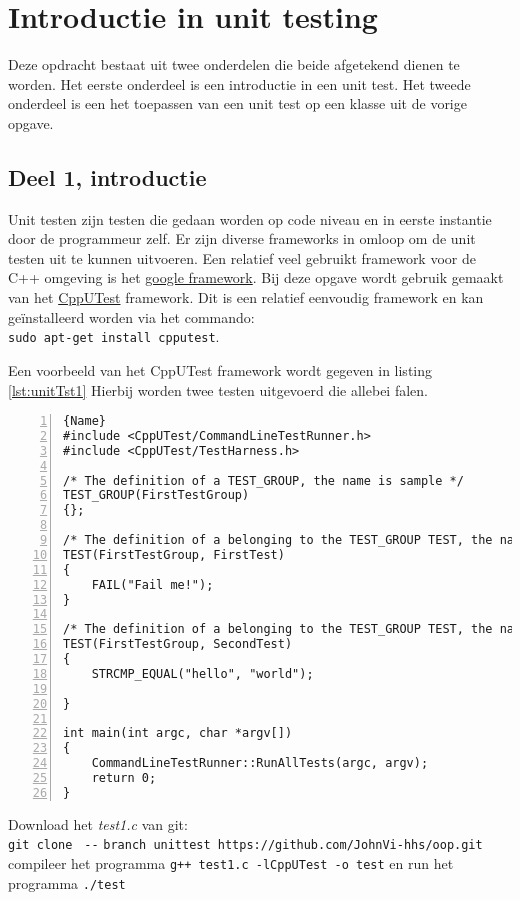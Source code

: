 \chapter{Introductie in unit testing} \label{chap:unittst}

Deze opdracht bestaat uit twee onderdelen die beide afgetekend dienen te worden.
Het eerste onderdeel is een introductie in een unit test. Het tweede onderdeel is een het toepassen van een unit test op een klasse uit de vorige opgave.

\section{Deel 1, introductie}

Unit testen zijn testen die gedaan worden op code niveau en in eerste instantie door de programmeur zelf. 
Er zijn diverse frameworks in omloop om de unit testen uit te kunnen uitvoeren.
Een relatief veel gebruikt framework voor de C++ omgeving is het \href {https://github.com/google/googletest}{google framework}.         
Bij deze opgave wordt gebruik gemaakt van het \href{https://cpputest.github.io/} {CppUTest} framework. 
Dit is een relatief eenvoudig framework en kan geïnstalleerd worden via het commando:\\
\texttt{sudo apt-get install cpputest}.

Een voorbeeld van het CppUTest framework wordt gegeven in listing \ref{lst:unitTst1} Hierbij worden twee testen uitgevoerd die allebei falen.
\begin{lstlisting}[caption= Een eenvoudige unittest. ,frame=trbl,firstnumber=1,numbers=left,label={lst:unitTst1}]{Name}
#include <CppUTest/CommandLineTestRunner.h>
#include <CppUTest/TestHarness.h>

/* The definition of a TEST_GROUP, the name is sample */
TEST_GROUP(FirstTestGroup)
{};

/* The definition of a belonging to the TEST_GROUP TEST, the name is ret_int_success */
TEST(FirstTestGroup, FirstTest)
{
	FAIL("Fail me!");
}

/* The definition of a belonging to the TEST_GROUP TEST, the name is ret_int_failed */
TEST(FirstTestGroup, SecondTest)
{
	STRCMP_EQUAL("hello", "world");
	
}

int main(int argc, char *argv[])
{
	CommandLineTestRunner::RunAllTests(argc, argv);
	return 0;
}
\end{lstlisting}
Download het \textit{test1.c}  van git:\\
{\small \texttt{git clone } \verb|--| \texttt{branch unittest https://github.com/JohnVi-hhs/oop.git}}\\
compileer het programma \texttt{g++ test1.c -lCppUTest -o test} en 
run het programma   \texttt{./test}


